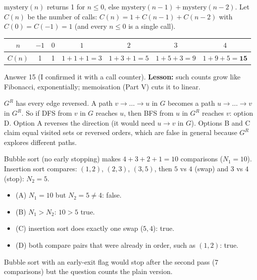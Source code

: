 \documentclass[11pt,a4paper]{article}
\begin{document}
\begin{example}
$\text{mystery}(n)$ returns 1 for $n\le0$, else $\text{mystery}(n-1)+\text{mystery}(n-2)$. Let $C(n)$ be the number of calls: $C(n)=1+C(n-1)+C(n-2)$ with $C(0)=C(-1)=1$ (and every $n\le0$ is a single call).
\begin{center}
\begin{tabular}{c|cccccc}$n$&$-1$&$0$&$1$&$2$&$3$&$4$\\\hline $C(n)$&1&1&$1+1+1=3$&$1+3+1=5$&$1+5+3=9$&$1+9+5=\mathbf{15}$\end{tabular}
\end{center}
Answer 15 (I confirmed it with a call counter). \textbf{Lesson:} such counts grow like Fibonacci, exponentially; memoisation (Part V) cuts it to linear.
\end{example}

\begin{example}
$G^R$ has every edge reversed. A path $v\to\dots\to u$ in $G$ becomes a path $u\to\dots\to v$ in $G^R$. So if DFS from $v$ in $G$ reaches $u$, then BFS from $u$ in $G^R$ reaches $v$: option D. Option A reverses the direction (it would need $u\to v$ in $G$). Options B and C claim equal visited sets or reversed orders, which are false in general because $G^R$ explores different paths.
\end{example}

\begin{example}
Bubble sort (no early stopping) makes $4+3+2+1=10$ comparisons ($N_1=10$). Insertion sort compares: $(1,2)$, $(2,3)$, $(3,5)$, then $5$ vs $4$ (swap) and $3$ vs $4$ (stop): $N_2=5$.
\begin{itemize}[leftmargin=*,itemsep=1pt]
\item (A) $N_1=10$ but $N_2=5\ne4$: false.
\item (B) $N_1>N_2$: $10>5$ true.
\item (C) insertion sort does exactly one swap ($5,4$): true.
\item (D) both compare pairs that were already in order, such as $(1,2)$: true.
\end{itemize}
Bubble sort with an early-exit flag would stop after the second pass ($7$ comparisons) but the question counts the plain version.
\end{example}
\end{document}
